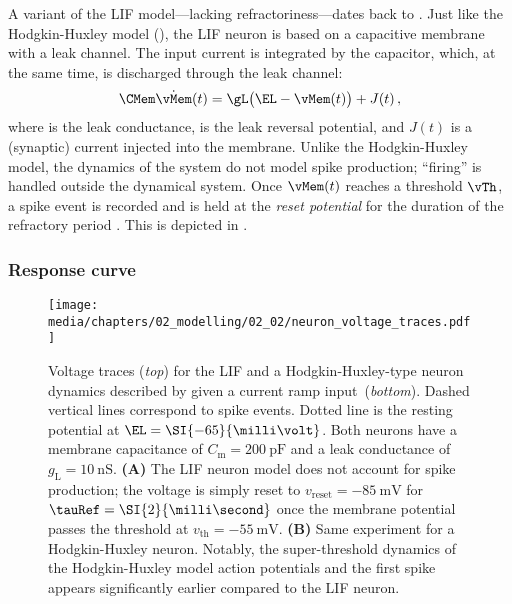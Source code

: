 A variant of the LIF model---lacking refractoriness---dates back to \citet{lapicque1907recherches}.
Just like the Hodgkin-Huxley model (), the LIF neuron is based on a capacitive membrane with a leak channel.
The input current is integrated by the capacitor, which, at the same time, is discharged through the leak channel:
\begin{align}
	\CMem \dot{\vMem}(t) =
		\gL \bigl(\EL - \vMem(t)\bigr) + J(t) \,,
	\label{eqn:lif}
\end{align}
where \gL is the leak conductance, \EL is the leak reversal potential, and $J(t)$ is a (synaptic) current injected into the membrane.
Unlike the Hodgkin-Huxley model, the dynamics of the system do not model spike production; \enquote{firing} is handled outside the dynamical system. 
Once $\vMem(t)$ reaches a threshold $\vTh$, a spike event is recorded and \vMem is held at the \emph{reset potential} \vReset for the duration of the refractory period \tauRef.
This is depicted in .

\subsubsection{Response curve}

\begin{figure}
	\centering
	\texttt{[image: media/chapters/02\_modelling/02\_02/neuron\_voltage\_traces.pdf]}
	\caption[Voltage traces for the LIF and Hodgkin-Huxley neuron model]{Voltage traces (\emph{top}) for the LIF and a Hodgkin-Huxley-type neuron dynamics described by \citet{traub1991neuronal} given a current ramp input~(\emph{bottom}). Dashed vertical lines correspond to spike events. Dotted line is the resting potential at $\EL=\SI{-65}{\milli\volt}$. Both neurons have a membrane capacitance of $C_\mathrm{m} = \SI{200}{\pico\farad}$ and a leak conductance of $g_\mathrm{L} = \SI{10}{\nano\siemens}$. \textbf{(A)} The LIF neuron model does not account for spike production; the voltage is simply reset to $v_\mathrm{reset} = \SI{-85}{\milli\volt}$ for $\tauRef = \SI{2}{\milli\second}$ once the membrane potential passes the threshold at $v_\mathrm{th} = -\SI{55}{\milli\volt}$. \textbf{(B)} Same experiment for a Hodgkin-Huxley neuron. Notably, the super-threshold dynamics of the Hodgkin-Huxley model action potentials and the first spike appears significantly earlier compared to the LIF neuron.}
	\label{fig:neuron_voltage_traces}
\end{figure}

